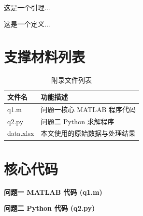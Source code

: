 \documentclass[withoutpreface,notoc]{cumcmthesis}
\begin{document}
	\begin{lemma}
		这是一个引理...
	\end{lemma}
	\begin{definition}
		这是一个定义...
	\end{definition}
	
	
	\newpage
	\begin{appendices}
		\section{支撑材料列表}
		\begin{table}[H]
			\centering
			\caption{附录文件列表}
			\label{tab:文件列表}
			\begin{tabularx}{\textwidth}{LL}
				\toprule
				文件名 & 功能描述 \\
				\midrule
				q1.m & 问题一核心 MATLAB 程序代码 \\
				q2.py & 问题二 Python 求解程序 \\
				data.xlsx & 本文使用的原始数据与处理结果 \\
				\bottomrule
			\end{tabularx}
		\end{table}
		
		\section{核心代码}
		\noindent\textbf{问题一 MATLAB 代码 (q1.m)}
		
		
		\noindent\textbf{问题二 Python 代码 (q2.py)}
		
		
	\end{appendices}
	
\end{document}

